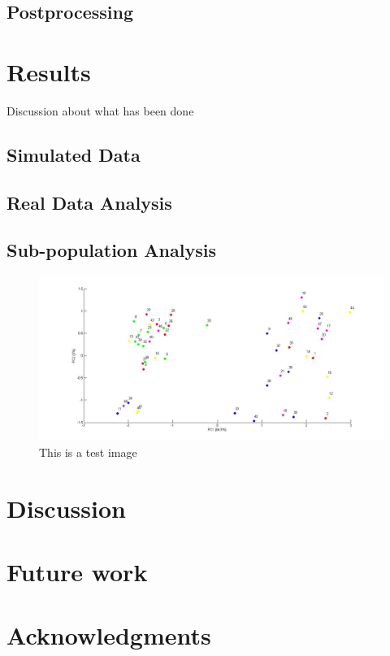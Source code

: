 \documentclass[twocolumn,oneside,conference]
{IEEEtran}
\begin{document}
\subsection{Postprocessing}

\section{Results}
Discussion about what has been done
\subsection{Simulated Data}
\subsection{Real Data Analysis}
\subsection{Sub-population Analysis}
\begin{figure}[h]
	\includegraphics[width=\textwidth]{final.jpg}
	\caption{This is a test image}
	\label{fig1: this is test image}
\end{figure}

\section{Discussion}

\section{Future work}

\section*{Acknowledgments}


\printbibliography
\end{document}
